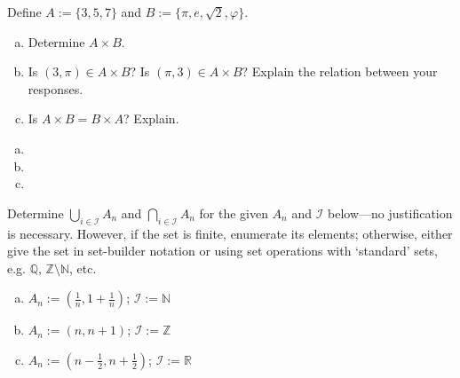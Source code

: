 \documentclass[11pt,letterpaper]{article}
\begin{document}
\sol
\begin{2enumerate}
\item 
\item 
\item 
\item 
\item 
\item 
\item 
\item 
\item 
\item 
\item 
\item 
\end{2enumerate}



\newpage



 Define $A:= \{ 3, 5, 7 \}$ and $B:= \{ \pi, e, \sqrt{2}, \varphi \}$. 
	\begin{enumerate}[(a)]
	\item Determine $A \times B$.
	\item Is $(3, \pi) \in A \times B$? Is $(\pi, 3) \in A \times B$? Explain the relation between your responses. 
	\item Is $A \times B= B \times A$? Explain. 
	\end{enumerate} \pspace

\sol
\begin{enumerate}[(a)]
\item 
\item 
\item 
\end{enumerate}



\newpage



 Determine $\displaystyle \bigcup_{i \in \mathcal{I}} A_n$ and $\displaystyle \bigcap_{i \in \mathcal{I}} A_n$ for the given $A_n$ and $\mathcal{I}$ below---no justification is necessary. However, if the set is finite, enumerate its elements; otherwise, either give the set in set-builder notation or using set operations with `standard' sets, e.g. $\mathbb{Q}$, $\mathbb{Z} \setminus \mathbb{N}$, etc. 
	\begin{enumerate}[(a)]
	\item $A_n:= \left( \frac{1}{n}, 1 + \frac{1}{n} \right)$; $\mathcal{I}:= \mathbb{N}$
	\item $A_n:= \left( n, n + 1 \right)$; $\mathcal{I}:= \mathbb{Z}$
	\item $A_n:= \left( n - \frac{1}{2}, n + \frac{1}{2} \right)$; $\mathcal{I}:= \mathbb{R}$
	\end{enumerate} \pspace
\end{document}
